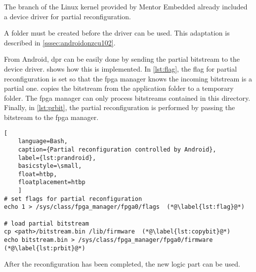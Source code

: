 The branch of the Linux kernel provided by Mentor Embedded \cite{linuxkernel} already included a device driver for partial reconfiguration.

A folder must be created before the driver can be used. This adaptation is described in \cref{sssec:androidonzcu102}. 

From Android, \gls{dpr} can be easily done by sending the partial bitstream to the device driver.  shows how this is implemented.
In \cref{lst:flag}, the flag for partial reconfiguration is set so that the \gls{fpga} manager knows the incoming bitstream is a partial one.  copies the bitstream from the application folder to a temporary folder. The \gls{fpga} manager can only process bitstreams contained in this directory. Finally, in \cref{lst:prbit}, the partial reconfiguration is performed by passing the bitstream to the \gls{fpga} manager.

\begin{lstlisting}[
    language=Bash,
    caption={Partial reconfiguration controlled by Android},
    label={lst:prandroid},
    basicstyle=\small,
    float=htbp,
    floatplacement=htbp
    ]
# set flags for partial reconfiguration
echo 1 > /sys/class/fpga_manager/fpga0/flags  (*@\label{lst:flag}@*)

# load partial bitstream
cp <path>/bitstream.bin /lib/firmware  (*@\label{lst:copybit}@*)
echo bitstream.bin > /sys/class/fpga_manager/fpga0/firmware  (*@\label{lst:prbit}@*)
\end{lstlisting}

After the reconfiguration has been completed, the new logic part can be used.